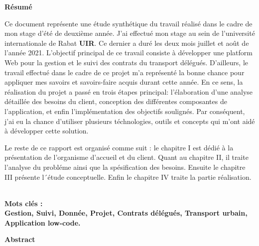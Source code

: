\documentclass[a4paper]{report}
\begin{document}
\clearpage
{}
\begin{doublespace}
    \begin{center}
        \vspace*{1cm}

        \textbf{\huge{Résumé}}

    \end{center}
\end{doublespace}
\begin{doublespace}

    Ce document représente une étude synthétique du travail réalisé dans le cadre de mon stage d'été de deuxième année. J'ai effectué mon stage au sein de
    l'université internationale de Rabat \textbf{UIR}. Ce dernier a duré les deux mois juillet et août de l'année 2021. L’objectif principal de ce travail consiste à
    développer une platform Web pour la gestion et le suivi des contrats du transport délégués. D'ailleurs, le travail effectué dans le cadre de ce
    projet m'a représenté la bonne chance pour appliquer mes savoirs et savoirs-faire acquis durant cette année. En ce sens, la réalisation du projet
    a passé en trois étapes principal: l'élaboration d'une analyse détaillée des besoins du client, conception des différentes composantes de l'application,
    et enfin l'implémentation des objectifs soulignés. Par conséquent, j'ai eu la chance d'utiliser plusieurs téchnologies, outils et concepts
    qui m'ont aidé à développer cette solution.

\end{doublespace}
\begin{doublespace}

    Le reste de ce rapport est organisé comme suit : le chapitre I est dédié à la présentation de
    l’organisme d’accueil et du client. Quant au chapitre II, il traite l’analyse du probléme ainsi que
    la spésification des besoins. Ensuite le chapitre III présente l´étude conceptuelle. Enfin le chapitre
    IV traite la partie réalisation.

    \textbf	{\\Mots clés :\\ Gestion, Suivi, Donnée, Projet, Contrats délégués, Transport urbain, Application low-code.}

\end{doublespace}
\clearpage
{}
\begin{doublespace}
    \begin{center}
        \vspace*{1cm}

        \textbf{\huge{Abstract}}
    \end{center}
\end{doublespace}
\end{document}
